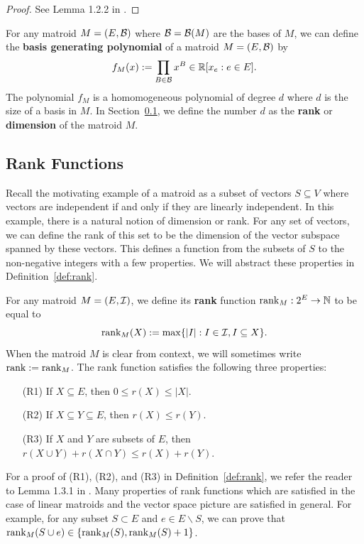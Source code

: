 \documentclass{puthesis-UG}
\begin{document}
\begin{proof}
	See Lemma 1.2.2 in \cite{10.5555/1197093}. 
\end{proof}

For any matroid $M = (E, \mathcal{B})$ where $\mathcal{B} = \mathcal{B}(M)$ are the bases of $M$, we can define the \textbf{basis generating polynomial} of a matroid $M = (E, \mathcal{B})$ by
\[
	f_M (x) := \prod_{B \in \mathcal{B}} x^B \in \mathbb{R}[x_e : e \in E].
\]
The polynomial $f_M$ is a homomogeneous polynomial of degree $d$ where $d$ is the size of a basis in $M$. In Section~\ref{sec:rank}, we define the number $d$ as the \textbf{rank} or \textbf{dimension} of the matroid $M$. 

\subsection{Rank Functions} \label{sec:rank}

Recall the motivating example of a matroid as a subset of vectors $S \subseteq V$ where vectors are independent if and only if they are linearly independent. In this example, there is a natural notion of dimension or rank. For any set of vectors, we can define the rank of this set to be the dimension of the vector subspace spanned by these vectors. This defines a function from the subsets of $S$ to the non-negative integers with a few properties. We will abstract these properties in Definition~\ref{def:rank}. 

\begin{defn} \label{def:rank}
	For any matroid $M = (E, \mathcal{I})$, we define its \textbf{rank} function $\operatorname{rank}_M : 2^E \to \mathbb{N}$ to be equal to
	\[
		\operatorname{rank}_M(X) := \max \{|I| : I \in \mathcal{I}, I \subseteq X\}.
	\]
	When the matroid $M$ is clear from context, we will sometimes write $\operatorname{rank} := \operatorname{rank}_M$. The rank function satisfies the following three properties:
	\begin{enumerate}
		\item[(R1)] If $X \subseteq E$, then $0 \leq r(X) \leq |X|$. 
		\item[(R2)] If $X \subseteq Y \subseteq E$, then $r(X) \leq r(Y)$. 
		\item[(R3)] If $X$ and $Y$ are subsets of $E$, then $r(X \cup Y) + r(X \cap Y) \leq r(X) + r(Y)$.
	\end{enumerate}
\end{defn}

For a proof of (R1), (R2), and (R3) in Definition~\ref{def:rank}, we refer the reader to Lemma 1.3.1 in \cite{10.5555/1197093}. Many properties of rank functions which are satisfied in the case of linear matroids and the vector space picture are satisfied in general. For example, for any subset $S \subset E$ and $e \in E \backslash S$, we can prove that $\operatorname{rank}_M(S \cup e) \in \{\operatorname{rank}_M(S), \operatorname{rank}_M(S) + 1\}$. 
\end{document}
